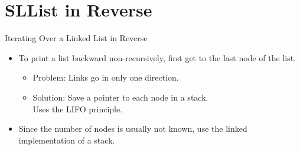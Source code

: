 \documentclass[14pt,aspectratio=1610]{beamer}
\begin{document}

\section{SLList in Reverse}

\begin{frame}{Iterating Over a Linked List in Reverse}
\begin{itemize}
  \item
    To print a list backward non-recursively, first get to the last node of the list.
    \begin{itemize}
      \item
        Problem: Links go in only one direction.
      \item
        Solution: Save a pointer to each node in a stack.\\
        Uses the LIFO principle.
    \end{itemize}
  \item
    Since the number of nodes is usually not known, use the linked implementation of a stack.
\end{itemize}  
\end{frame}
\end{document}
